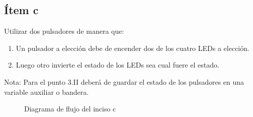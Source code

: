 \documentclass[12pt,a4paper]{article}
\begin{document}

\begin{pyglist}[caption={nombre del programa.c}] 
\end{pyglist}

\subsection*{Ítem c} Utilizar dos pulsadores de manera que:

\renewcommand{\labelenumi}{\Roman{enumi}.} %
\begin{enumerate}
	\item Un pulsador a elección debe de encender dos de los cuatro LEDs a elección.
	\item  Luego otro invierte el estado de los LEDs sea cual fuere el estado.
\end{enumerate}

Nota: Para el punto 3.II deberá de guardar el estado de los pulsadores en una variable auxiliar
o bandera.


\begin{figure} [H] %
	\centering
	\caption{Diagrama de flujo del inciso c}
	\label{fig:inciso_c}
\end{figure}


\begin{pyglist}[caption={nombre del programa.c}] 
\end{pyglist}
\end{document}
